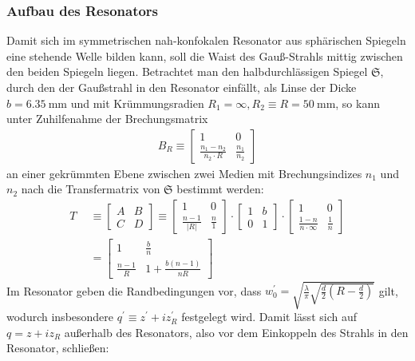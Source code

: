 \documentclass[11pt,a4paper,oneside]{scrartcl}
\begin{document}
\subsubsection{Aufbau des Resonators}
\setcounter{figure}{3}
Damit sich im symmetrischen nah-konfokalen Resonator aus sphärischen Spiegeln eine stehende Welle bilden kann, soll die Waist des Gauß-Strahls mittig zwischen den beiden Spiegeln liegen. Betrachtet man den halbdurchlässigen Spiegel $\mathfrak{S}$, durch den der Gaußstrahl in den Resonator einfällt, als Linse der Dicke $b=6.35\ \mathrm{mm}$ und mit Krümmungsradien $R_1=\infty,R_2\equiv R=50\ \mathrm{mm}$, so kann unter Zuhilfenahme der Brechungsmatrix 
\begin{align}
B_R\equiv \begin{bmatrix}
1 & 0\\
\frac{n_1-n_2}{n_2\cdot R} & \frac{n_1}{n_2}
\end{bmatrix} 
\end{align}
an einer gekrümmten Ebene zwischen zwei Medien mit Brechungsindizes $n_1$ und $n_2$
nach \cite{dewiki:225621757} die Transfermatrix von $\mathfrak{S}$ bestimmt werden:
\begin{align}
T & \equiv
\begin{bmatrix}
A & B\\
C & D 
\end{bmatrix} 
\equiv
\begin{bmatrix}
1 & 0\\
\frac{n-1}{|R|} & \frac{n}{1}
\end{bmatrix} 
\cdot
\begin{bmatrix}
1 & b\\
0 & 1
\end{bmatrix} 
\cdot
\begin{bmatrix}
1 & 0\\
\frac{1-n}{n\cdot \infty} & \frac{1}{n}
\end{bmatrix} 
\\ \quad& = \begin{bmatrix}
1 & \frac{b}{n}\\
\frac{n-1}{R} & 1+\frac{b(n-1)}{nR}
\end{bmatrix}
\end{align}
Im Resonator geben die Randbedingungen vor, dass $w_0^\prime=\sqrt{\frac{\lambda}{\pi}\sqrt{\frac{d}{2}\left(R-\frac{d}{2}\right)}}$ gilt, wodurch insbesondere $q^\prime\equiv z^\prime+iz_R^\prime$ festgelegt wird. Damit lässt sich auf $q=z+iz_R$ außerhalb des Resonators, also vor dem Einkoppeln des Strahls in den Resonator, schließen:
\end{document}

